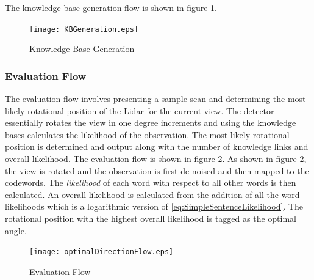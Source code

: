 \documentclass[journal]{IEEEtran}
\begin{document}
The knowledge base generation flow is shown in figure \ref{fig:Knowledge Base Generation Block Diagram}.
\begin{figure}[!t]
\centerline{
\mbox{\texttt{[image: KBGeneration.eps]}}
}
\caption{Knowledge Base Generation}
\label{fig:Knowledge Base Generation Block Diagram}
\end{figure}

\subsubsection{Evaluation Flow}
\label{sec:Evaluation Flow}
The evaluation flow involves presenting a sample scan and determining the most likely rotational position of the Lidar for the current view.
The detector essentially rotates the view in one degree increments and using the knowledge bases calculates the likelihood of the observation.
The most likely rotational position is determined and output along with the number of knowledge links and overall likelihood.
The evaluation flow is shown in figure \ref{fig:Evaluation Flow Block Diagram}. 
As shown in figure \ref{fig:Evaluation Flow Block Diagram}, the view is rotated and the observation is first de-noised and then mapped to the codewords.
The {\it{likelihood}} of each word with respect to all other words is then calculated. An overall likelihood is calculated from the addition of all the word likelihoods
which is a logarithmic version of \eqref{eq:SimpleSentenceLikelihood}.
The rotational position with the highest overall likelihood is tagged as the optimal angle.
 
\begin{figure}[!t]
\centerline{
\mbox{\texttt{[image: optimalDirectionFlow.eps]}}
}
\caption{Evaluation Flow}
\label{fig:Evaluation Flow Block Diagram}
\end{figure}
\end{document}
